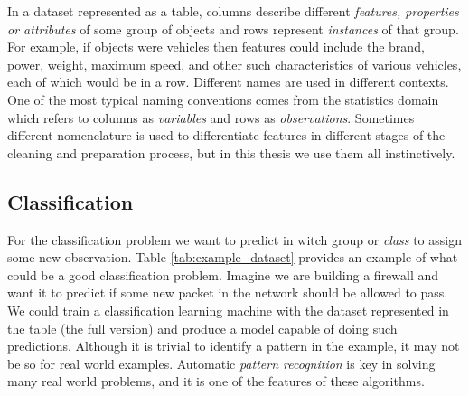 In a dataset represented as a table, columns describe different \emph{features, properties or attributes} of some group of objects and rows represent \emph{instances} of that group. For example, if objects were vehicles then features could include the brand, power, weight, max\-imum speed, and other such characteristics of various vehicles, each of which would be in a row. Different names are used in different contexts. One of the most typical naming conventions comes from the statistics domain which refers to columns as \emph{variables} and rows as \emph{observations}. Sometimes different nomenclature is used to differentiate features in different stages of the cleaning and preparation process, but in this thesis we use them all instinctively.

\begin{table}[h]
    \caption{Example dataset extracted from the Internet Firewall Data (\cite{ertam_internet_2019}). Only five observations and main variables shown. }
    \label{tab:example_dataset}
\end{table}

\subsection{Classification}

For the classification problem we want to predict in witch group or \emph{class} to assign some new observation. Table \ref{tab:example_dataset} provides an example of what could be a good classification problem. Imagine we are building a firewall and want it to predict if some new packet in the network should be allowed to pass. We could train a classification learning machine with the dataset represented in the table (the full version) and produce a model capable of doing such predictions. Although it is trivial to identify a pattern in the example, it may not be so for real world examples. Automatic \emph{pattern recognition} is key in solving many real world problems, and it is one of the features of these algorithms.

